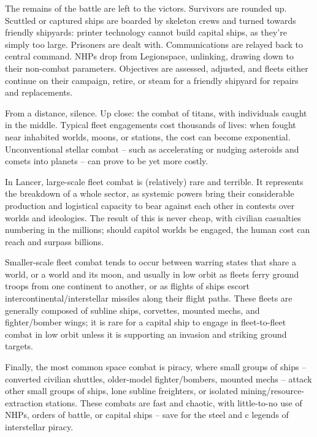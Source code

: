 The remains of the battle are left to the victors. Survivors are rounded up. Scuttled or captured  
ships are boarded by skeleton crews and turned towards friendly shipyards: printer technology  
cannot build capital ships, as they’re simply too large. Prisoners are dealt with. Communications  
are relayed back to central command. NHPs drop from Legionspace, unlinking, drawing down to  
their non-combat parameters. Objectives are assessed, adjusted, and fleets either continue on  
their campaign, retire, or steam for a friendly shipyard for repairs and replacements. 
 

From a distance, silence. Up close: the combat of titans, with individuals caught in the middle.  
Typical fleet engagements cost thousands of lives: when fought near inhabited worlds, moons, or  
stations, the cost can become exponential. Unconventional stellar combat -- such as  
accelerating or nudging asteroids and comets into planets -- can prove to be yet more costly.  
 

In Lancer, large-scale fleet combat is (relatively) rare and terrible. It represents the breakdown of  
a whole sector, as systemic powers bring their considerable production and logistical capacity to  
bear against each other in contests over worlds and ideologies. The result of this is never cheap,  
with civilian casualties numbering in the millions; should capitol worlds be engaged, the human  
cost can reach and surpass billions. 
 

Smaller-scale fleet combat tends to occur between warring states that share a world, or a world  
and its moon, and usually in low orbit as fleets ferry ground troops from one continent to another,  
or as flights of ships escort intercontinental/interstellar missiles along their flight paths. These  
fleets are generally composed of subline ships, corvettes, mounted mechs, and fighter/bomber  
wings; it is rare for a capital ship to engage in fleet-to-fleet combat in low orbit unless it is  
supporting an invasion and striking ground targets. 
 

Finally, the most common space combat is piracy, where small groups of ships -- converted  
civilian shuttles, older-model fighter/bombers, mounted mechs -- attack other small groups of  
ships, lone subline freighters, or isolated mining/resource-extraction stations. These combats are  
fast and chaotic, with little-to-no use of NHPs, orders of battle, or capital ships -- save for the  
steel and c legends of interstellar piracy.  
 